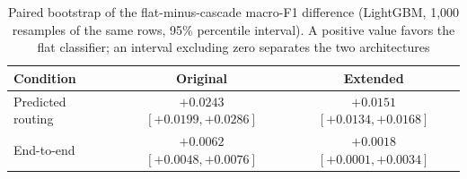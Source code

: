 \begin{table}[!t]
\caption{Paired bootstrap of the flat-minus-cascade macro-F1 difference
(LightGBM, 1,000 resamples of the same rows, 95\% percentile
interval). A positive value favors the flat classifier; an interval excluding
zero separates the two architectures}
\label{tab:bootstrap}
\centering
\small
\begin{tabular}{lcc}
\toprule
Condition & Original & Extended \\
\midrule
Predicted routing & $+0.0243$ $[+0.0199, +0.0286]$ & $+0.0151$ $[+0.0134, +0.0168]$ \\
End-to-end & $+0.0062$ $[+0.0048, +0.0076]$ & $+0.0018$ $[+0.0001, +0.0034]$ \\
\bottomrule
\end{tabular}
\end{table}
